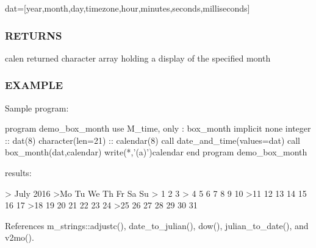 dat=\mbox{[}year,month,day,timezone,hour,minutes,seconds,milliseconds\mbox{]} \subsubsection*{R\+E\+T\+U\+R\+NS}

calen returned character array holding a display of the specified month

\subsubsection*{E\+X\+A\+M\+P\+LE}

\begin{DoxyVerb}Sample program:

 program demo_box_month
 use M_time, only : box_month
 implicit none
 integer           :: dat(8)
 character(len=21) :: calendar(8)
    call date_and_time(values=dat)
    call box_month(dat,calendar)
    write(*,'(a)')calendar
 end program demo_box_month

results:

  >     July 2016
  >Mo Tu We Th Fr Sa Su
  >             1  2  3
  > 4  5  6  7  8  9 10
  >11 12 13 14 15 16 17
  >18 19 20 21 22 23 24
  >25 26 27 28 29 30 31 \end{DoxyVerb}
 

References m\+\_\+strings\+::adjustc(), date\+\_\+to\+\_\+julian(), dow(), julian\+\_\+to\+\_\+date(), and v2mo().

